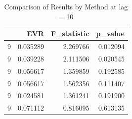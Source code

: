 \begin{table}
\caption{Comparison of Results by Method at lag = 10}
\label{tab:results_by_method}
\begin{tabular}{lrrr}
\toprule
 & EVR & F\_statistic & p\_value \\
\midrule
9 & 0.035289 & 2.269766 & 0.012094 \\
9 & 0.039228 & 2.111506 & 0.020545 \\
9 & 0.056617 & 1.359859 & 0.192585 \\
9 & 0.056617 & 1.562356 & 0.111407 \\
9 & 0.024581 & 1.361241 & 0.191900 \\
9 & 0.071112 & 0.816095 & 0.613135 \\
\bottomrule
\end{tabular}
\end{table}
